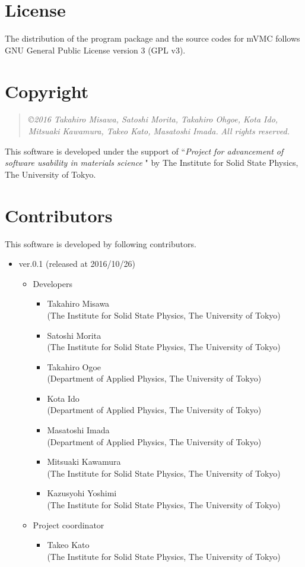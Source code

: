 \section{License}
The distribution of the program package and the source codes for mVMC follows GNU General Public License version 3 (GPL v3). 
\section{Copyright}
\begin{quote}
{\it \copyright 2016 Takahiro Misawa, Satoshi Morita, Takahiro Ohgoe, Kota Ido, Mitsuaki Kawamura, Takeo Kato, Masatoshi Imada.} {\it  All rights reserved.}
\end{quote}
This software is developed under the support of ``{\it Project for advancement of software usability in materials science }" by The Institute for Solid State Physics, The University of Tokyo. 

\section{Contributors}
\label{subsec:developers}
This software is developed by following contributors.
\begin{itemize}
\item{ver.0.1 (released at 2016/10/26)}
\begin{itemize}
\item{Developers}
	\begin{itemize}
	\item{Takahiro Misawa \\(The Institute for Solid State Physics, The University of Tokyo)}
	\item{Satoshi Morita \\(The Institute for Solid State Physics, The University of Tokyo)}
	\item{Takahiro Ogoe \\(Department of Applied Physics, The University of Tokyo)}
	\item{Kota Ido \\(Department of Applied Physics, The University of Tokyo)}
	\item{Masatoshi Imada \\(Department of Applied Physics, The University of Tokyo)}
	\item{Mitsuaki Kawamura \\(The Institute for Solid State Physics, The University of Tokyo)}
	\item{Kazusyohi Yoshimi \\(The Institute for Solid State Physics, The University of Tokyo)}
	\end{itemize}

\item{Project coordinator}
	\begin{itemize}
	\item{Takeo Kato \\(The Institute for Solid State Physics, The University of Tokyo)}
	\end{itemize}

\end{itemize}

\end{itemize}


